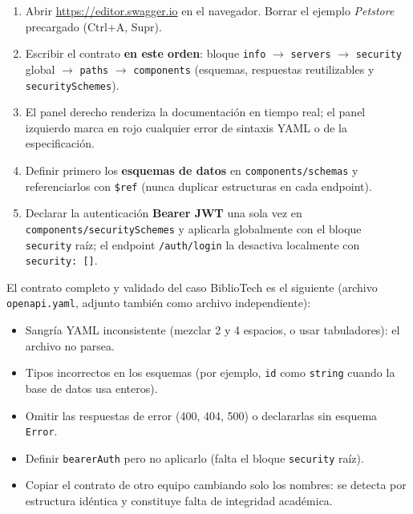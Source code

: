 \documentclass[11pt,a4paper]{article}
\begin{document}
\begin{cajapaso}
\begin{enumerate}
  \item Abrir \url{https://editor.swagger.io} en el navegador. Borrar el ejemplo \textit{Petstore} precargado (Ctrl+A, Supr).
  \item Escribir el contrato \textbf{en este orden}: bloque \texttt{info} $\rightarrow$ \texttt{servers} $\rightarrow$ \texttt{security} global $\rightarrow$ \texttt{paths} $\rightarrow$ \texttt{components} (esquemas, respuestas reutilizables y \texttt{securitySchemes}).
  \item El panel derecho renderiza la documentación en tiempo real; el panel izquierdo marca en rojo cualquier error de sintaxis YAML o de la especificación.
  \item Definir primero los \textbf{esquemas de datos} en \texttt{components/schemas} y referenciarlos con \texttt{\$ref} (nunca duplicar estructuras en cada endpoint).
  \item Declarar la autenticación \textbf{Bearer JWT} una sola vez en \texttt{components/securitySchemes} y aplicarla globalmente con el bloque \texttt{security} raíz; el endpoint \texttt{/auth/login} la desactiva localmente con \texttt{security: []}.
\end{enumerate}
\end{cajapaso}

El contrato completo y validado del caso BiblioTech es el siguiente (archivo \texttt{openapi.yaml}, adjunto también como archivo independiente):



\begin{cajaalerta}
\begin{itemize}
  \item Sangría YAML inconsistente (mezclar 2 y 4 espacios, o usar tabuladores): el archivo no parsea.
  \item Tipos incorrectos en los esquemas (por ejemplo, \texttt{id} como \texttt{string} cuando la base de datos usa enteros).
  \item Omitir las respuestas de error (400, 404, 500) o declararlas sin esquema \texttt{Error}.
  \item Definir \texttt{bearerAuth} pero no aplicarlo (falta el bloque \texttt{security} raíz).
  \item Copiar el contrato de otro equipo cambiando solo los nombres: se detecta por estructura idéntica y constituye falta de integridad académica.
\end{itemize}
\end{cajaalerta}
\end{document}
